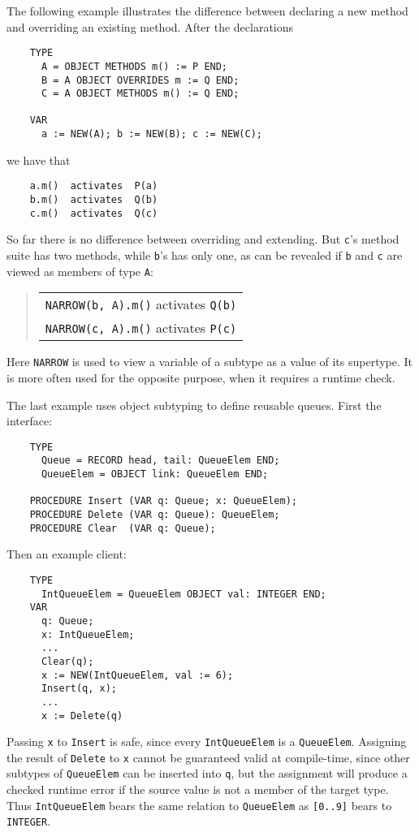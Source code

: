 \documentclass[10pt]{article}
\begin{document}
The following example illustrates the difference between declaring a new
method and overriding an existing method.  After the declarations
\begin{verbatim}
    TYPE
      A = OBJECT METHODS m() := P END;
      B = A OBJECT OVERRIDES m := Q END;
      C = A OBJECT METHODS m() := Q END;

    VAR
      a := NEW(A); b := NEW(B); c := NEW(C);
\end{verbatim}
we have that
\begin{verbatim}
    a.m()  activates  P(a)
    b.m()  activates  Q(b)
    c.m()  activates  Q(c)
\end{verbatim}
So far there is no difference between overriding and extending.  But
\verb|c|'s method suite has two methods, while \verb|b|'s has only one, as can
be revealed if \verb|b| and \verb|c| are viewed as members of type \verb|A|:
\begin{quote}
  \begin{tabular}{l}
    \verb|NARROW(b, A).m()|   activates  \verb|Q(b)| \\
    \verb|NARROW(c, A).m()|   activates  \verb|P(c)| \\
  \end{tabular}
\end{quote}
Here \verb|NARROW| is used to view a variable of a subtype as a value of its
supertype.  It is more often used for the opposite purpose, when it requires a
runtime check.

The last example uses object subtyping to define reusable queues.  First the
interface:
\begin{verbatim}
    TYPE
      Queue = RECORD head, tail: QueueElem END;
      QueueElem = OBJECT link: QueueElem END;

    PROCEDURE Insert (VAR q: Queue; x: QueueElem);
    PROCEDURE Delete (VAR q: Queue): QueueElem;
    PROCEDURE Clear  (VAR q: Queue);
\end{verbatim}

Then an example client:
\begin{verbatim}
    TYPE
      IntQueueElem = QueueElem OBJECT val: INTEGER END;
    VAR
      q: Queue;
      x: IntQueueElem;
      ...
      Clear(q);
      x := NEW(IntQueueElem, val := 6);
      Insert(q, x);
      ...
      x := Delete(q)
\end{verbatim}

Passing \verb|x| to \verb|Insert| is safe, since every \verb|IntQueueElem| is
a \verb|QueueElem|.  Assigning the result of \verb|Delete| to \verb|x| cannot
be guaranteed valid at compile-time, since other subtypes of \verb|QueueElem|
can be inserted into \verb|q|, but the assignment will produce a checked
runtime error if the source value is not a member of the target type.  Thus
\verb|IntQueueElem| bears the same relation to \verb|QueueElem| as
\verb|[0..9]| bears to \verb|INTEGER|.
\end{document}
